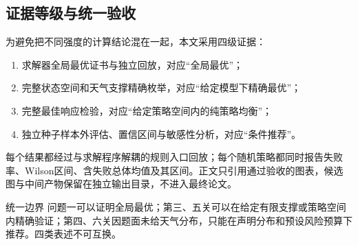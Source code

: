 \subsection{证据等级与统一验收}

为避免把不同强度的计算结论混在一起，本文采用四级证据：

\begin{enumerate}
  \item {} 求解器全局最优证书与独立回放，对应“全局最优”；
  \item {} 完整状态空间和天气支撑精确枚举，对应“给定模型下精确最优”；
  \item {} 完整最佳响应检验，对应“给定策略空间内的纯策略均衡”；
  \item {} 独立种子样本外评估、置信区间与敏感性分析，对应“条件推荐”。
\end{enumerate}

每个结果都经过与求解程序解耦的规则入口回放；每个随机策略都同时报告失败率、Wilson区间、含失败总体均值及其区间。正文只引用通过验收的图表，候选图与中间产物保留在独立输出目录，不进入最终论文。

\begin{resultbox}{统一边界}
问题一可以证明全局最优；第三、五关可以在给定有限支撑或策略空间内精确验证；第四、六关因题面未给天气分布，只能在声明分布和预设风险预算下推荐。四类表述不可互换。
\end{resultbox}
